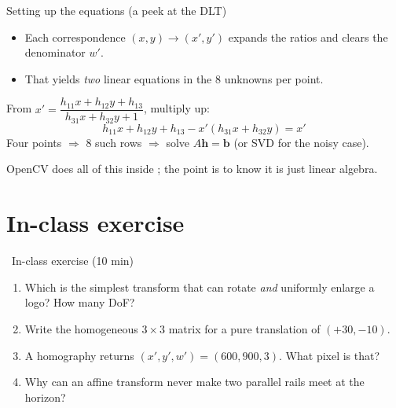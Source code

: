 \documentclass[10pt,aspectratio=169]{beamer}
\begin{document}
\begin{frame}{Setting up the equations (a peek at the DLT)}
  \begin{itemize}
    \item Each correspondence $(x,y)\!\to\!(x',y')$ expands the ratios and clears the denominator $w'$.
    \item That yields \emph{two} linear equations in the 8 unknowns per point.
  \end{itemize}
  \begin{mathbox}
    From $x'=\dfrac{h_{11}x+h_{12}y+h_{13}}{h_{31}x+h_{32}y+1}$, multiply up:
    \[ h_{11}x+h_{12}y+h_{13}-x'(h_{31}x+h_{32}y)=x' \]
    Four points $\Rightarrow$ 8 such rows $\Rightarrow$ solve $A\mathbf{h}=\mathbf{b}$ (or SVD for the noisy case).
  \end{mathbox}
  \begin{infobox}
    OpenCV does all of this inside ; the point is to know it is just linear algebra.
  \end{infobox}
\end{frame}

\section{In-class exercise}

\begin{frame}{\faPen~In-class exercise (10 min)}
  \begin{infobox}
  \end{infobox}
  \begin{enumerate}
    \item Which is the simplest transform that can rotate \emph{and} uniformly enlarge a logo? How many DoF?
    \item Write the homogeneous $3\times3$ matrix for a pure translation of $(+30,-10)$.
    \item A homography returns $(x',y',w')=(600,900,3)$. What pixel is that?
    \item Why can an affine transform never make two parallel rails meet at the horizon?
  \end{enumerate}
\end{frame}
\end{document}
